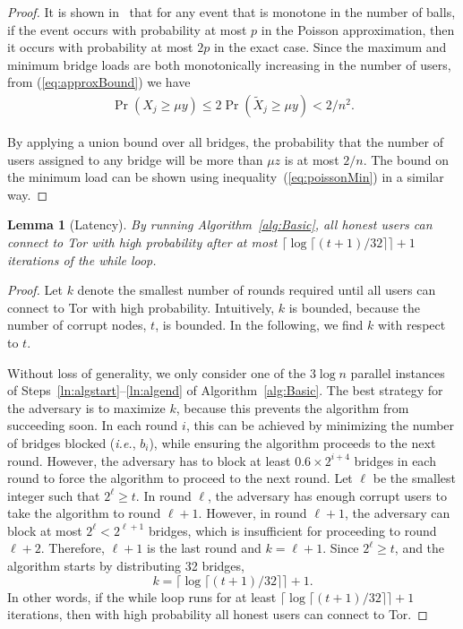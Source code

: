 \documentclass[USenglish,oneside,twocolumn]{article}
\newcommand{\ie}{\textit{i.e.}}
\newtheorem{lemma}{Lemma}
\newcommand{\sfsize}{\fontsize{0.68\baselineskip}{0.68\baselineskip}\selectfont}
\newcommand{\sans}[1]{\textsf{\sfsize \mbox{#1}}}
\begin{document}
\begin{proof}
	It is shown in~\cite[Corollary 5.11]{Michael2005} that for any event that is monotone in the number of balls, if the event occurs with probability at most $p$ in the Poisson approximation, then it occurs with probability at most $2p$ in the exact case. Since the maximum and minimum bridge loads are both monotonically increasing in the number of users, from (\ref{eq:approxBound}) we have
	\begin{align*}
		\Pr(X_j \geq \mu y) \leq 2\Pr(\tilde{X}_j \geq \mu y) < 2/n^2.
	\end{align*}
	
	By applying a union bound over all bridges, the probability that the number of users assigned to any bridge will be more than $\mu z$ is at most $2/n$. The bound on the minimum load can be shown using inequality~(\ref{eq:poissonMin}) in a similar way.
\end{proof}

\begin{lemma}[\sans{Latency}] \label{lem:NumIterationsBasic}
	By running Algorithm~\ref{alg:Basic}, all honest users can connect to Tor with high probability after at most ${\lceil \log{\lceil (t+1)/32 \rceil} \rceil + 1}$ iterations of the while loop.
\end{lemma}
\begin{proof}
	Let $k$ denote the smallest number of rounds required until all users can connect to Tor with high probability. Intuitively, $k$ is  bounded, because the number of corrupt nodes, $t$, is bounded. In the following, we find $k$ with respect to $t$. 
	
	Without loss of generality, we only consider one of the $3\log{n}$ parallel instances of Steps~\ref{ln:algstart}--\ref{ln:algend} of Algorithm~\ref{alg:Basic}. The best strategy for the adversary is to maximize $k$, because this prevents the algorithm from succeeding soon. In each round $i$, this can be achieved by minimizing the number of bridges blocked (\ie, $b_i$), while ensuring the algorithm proceeds to the next round. However, the adversary has to block at least ${0.6 \times 2^{i+4}}$ bridges in each round to force the algorithm to proceed to the next round. Let $\ell$ be the smallest integer such that ${2^\ell \geq t}$. In round $\ell$, the adversary has enough corrupt users to take the algorithm to round ${\ell + 1}$. However, in round ${{\ell + 1}}$, the adversary can block at most ${2^\ell < 2^{\ell+1}}$ bridges, which is insufficient for proceeding to round ${\ell + 2}$. Therefore, ${\ell + 1}$ is the last round and ${k = \ell + 1}$. Since ${2^\ell \geq t}$, and the algorithm starts by distributing 32 bridges, 
	\[k = \lceil \log{\lceil (t+1)/32 \rceil} \rceil + 1.\] 
	In other words, if the while loop runs for at least ${\lceil \log{\lceil (t+1)/32 \rceil} \rceil + 1}$ iterations, then with high probability all honest users can connect to Tor.
\end{proof}
\end{document}
